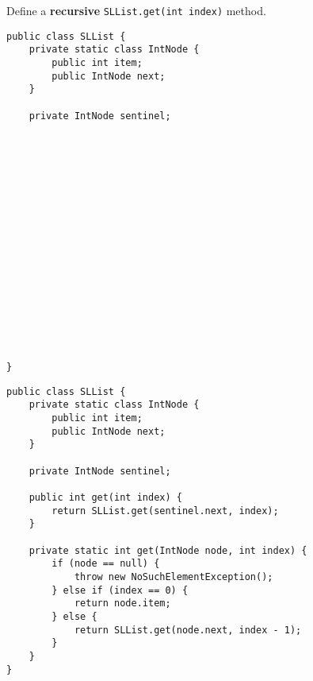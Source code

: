 \question Define a \textbf{recursive} \texttt{SLList.get(int index)} method.

\ifprintanswers\else
\begin{lstlisting}
public class SLList {
    private static class IntNode {
        public int item;
        public IntNode next;
    }

    private IntNode sentinel;


















}
\end{lstlisting}
\fi

\begin{solution}
\begin{lstlisting}
public class SLList {
    private static class IntNode {
        public int item;
        public IntNode next;
    }

    private IntNode sentinel;

    public int get(int index) {
        return SLList.get(sentinel.next, index);
    }

    private static int get(IntNode node, int index) {
        if (node == null) {
            throw new NoSuchElementException();
        } else if (index == 0) {
            return node.item;
        } else {
            return SLList.get(node.next, index - 1);
        }
    }
}
\end{lstlisting}
\end{solution}